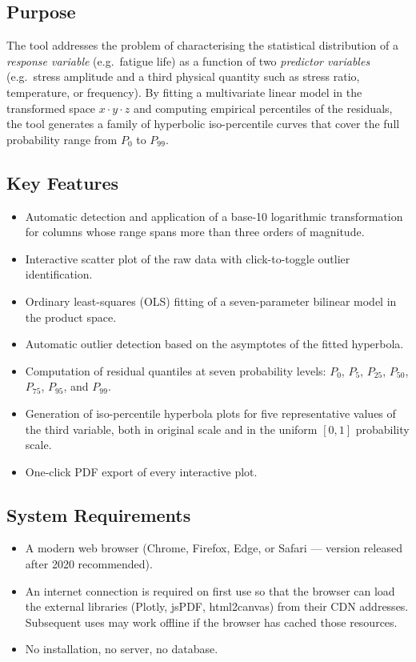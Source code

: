 \documentclass[12pt,a4paper]{article}
\begin{document}
\subsection{Purpose}

The tool addresses the problem of characterising the statistical distribution of a
\emph{response variable} (e.g.\ fatigue life) as a function of two \emph{predictor
variables} (e.g.\ stress amplitude and a third physical quantity such as stress ratio,
temperature, or frequency).  By fitting a multivariate linear model in the transformed
space $x \cdot y \cdot z$ and computing empirical percentiles of the residuals, the
tool generates a family of hyperbolic iso-percentile curves that cover the full
probability range from $P_0$ to $P_{99}$.

\subsection{Key Features}

\begin{itemize}[leftmargin=1.5em]
    \item Automatic detection and application of a base-10 logarithmic transformation
          for columns whose range spans more than three orders of magnitude.
    \item Interactive scatter plot of the raw data with click-to-toggle outlier
          identification.
    \item Ordinary least-squares (OLS) fitting of a seven-parameter bilinear model
          in the product space.
    \item Automatic outlier detection based on the asymptotes of the fitted hyperbola.
    \item Computation of residual quantiles at seven probability levels:
          $P_0$, $P_5$, $P_{25}$, $P_{50}$, $P_{75}$, $P_{95}$, and $P_{99}$.
    \item Generation of iso-percentile hyperbola plots for five representative values
          of the third variable, both in original scale and in the uniform $[0,1]$
          probability scale.
    \item One-click PDF export of every interactive plot.
\end{itemize}

\subsection{System Requirements}

\begin{itemize}[leftmargin=1.5em]
    \item A modern web browser (Chrome, Firefox, Edge, or Safari --- version released
          after 2020 recommended).
    \item An internet connection is required on first use so that the browser can load
          the external libraries (Plotly, jsPDF, html2canvas) from their CDN addresses.
          Subsequent uses may work offline if the browser has cached those resources.
    \item No installation, no server, no database.
\end{itemize}
\end{document}

